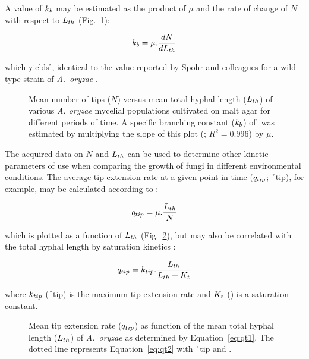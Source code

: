 \noindent A value of $k_b$ may be estimated as the product of $\mu$ and the rate of change of $N$ with respect to $L_{th}$ (Fig.~\ref{fig:NThl}):

\begin{equation}
	k_b = \mu . \frac{d N}{d L_{th}}
\end{equation}

\noindent which yields \h{}, identical to the value reported by Spohr and colleagues for a wild type strain of \emph{A.~oryzae} \cite{spohr1997}.

\begin{figure}[t]
	\centering
	\caption{Mean number of tips ($N$) versus mean total hyphal length ($L_{th}$) of various \emph{A. oryzae} mycelial populations cultivated on malt agar for different periods of time. A specific branching constant ($k_b$) of \h{} was estimated by multiplying the slope of this plot (; $R^2=0.996$) by $\mu$. }
	\label{fig:NThl}
\end{figure}

The acquired data on $N$ and $L_{th}$ can be used to determine other kinetic parameters of use when comparing the growth of fungi in different environmental conditions. The average tip extension rate at a given point in time ($q_{tip}$; \h{\omic~tip}), for example, may be calculated according to \cite{spohr1997}:

\begin{equation}\label{eq:qt1}
	q_{tip} = \mu . \frac{L_{th}}{N}
\end{equation}

\noindent which is plotted as a function of $L_{th}$ (Fig.~\ref{fig:qhypha}), but may also be correlated with the total hyphal length by saturation kinetics \cite{spohr1997}:

\begin{equation}\label{eq:qt2}
	q_{tip} = k_{tip} . \frac{L_{th}}{L_{th} + K_t}
\end{equation}

\noindent where $k_{tip}$ (\h{\omic~tip}) is the maximum tip extension rate and $K_t$ (\omic) is a saturation constant.

\begin{figure}[t]
	\centering
	\caption{Mean tip extension rate ($q_{tip}$) as function of the mean total hyphal length ($L_{th}$) of \emph{A.~oryzae} as determined by Equation~\ref{eq:qt1}. The dotted line represents Equation~\ref{eq:qt2} with \h{~tip} and .}
	\label{fig:qhypha}
\end{figure}

